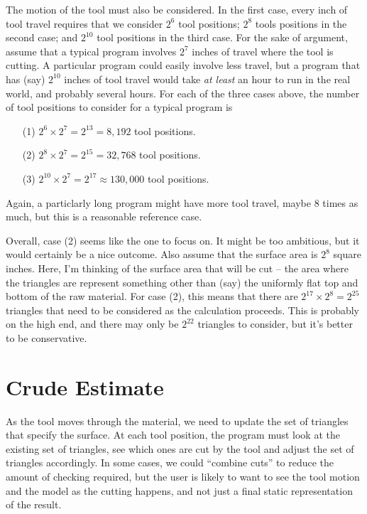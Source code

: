 \documentclass[titlepage,oneside,10pt]{article}
\begin{document}
The motion of the tool must also be considered. In the first case,
every inch of tool travel requires that we 
consider $2^6$ tool positions; $2^8$ tools positions in the second
case; and $2^{10}$ tool positions in the third case. For the sake of
argument, assume that a typical program involves $2^7$ inches of
travel where the tool is cutting. A particular program could easily
involve less travel, but a program that has (say) $2^{10}$ inches of
tool travel would take \emph{at least} an hour to run in the real world, 
and probably several hours. For each of the three cases above, the number of
tool positions to consider for a typical program is
\begin{itemize}
\itemsep=0pt
\item[(1)] $2^6\times 2^7 = 2^{13} = 8,192$ tool positions.
\item[(2)] $2^8\times 2^7 = 2^{15} = 32,768$ tool positions.
\item[(3)] $2^{10}\times 2^7 = 2^{17} \approx 130,000$ tool positions.
\end{itemize}
Again, a particlarly long program might have more tool travel, maybe 8
times as much, but this is a reasonable reference case.

Overall, case (2) seems like the one to focus on. It might be too
ambitious, but it would certainly be a nice outcome. Also assume that
the surface area is $2^8$ square inches. Here, I'm thinking of the
surface area that will be cut -- the area where the triangles are
represent something other than (say) the uniformly flat top and bottom
of the raw material. For case (2), this means that there are 
$2^{17}\times 2^8 = 2^{25}$ triangles that need to be considered as
the calculation proceeds. This is probably on the high end, and there
may only be $2^{22}$ triangles to consider, but it's better to be
conservative. 

\section{Crude Estimate}

As the tool moves through the material, we need to update the set of
triangles that specify the surface. At each tool position, the program
must look at the existing set of triangles, see which ones are cut by
the tool and adjust the set of triangles accordingly. In some cases,
we could ``combine cuts'' to reduce the amount of checking required,
but the user is likely to want to see the tool motion and the model as
the cutting happens, and not just a final static representation of the
result. 
\end{document}
